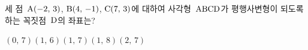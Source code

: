 세 점~$\mathrm{A}(-2,\,3)$, $\mathrm{B}(4,\,-1)$, $\mathrm{C}(7,\,3)$에 대하여 사각형~$\mathrm{ABCD}$가 평행사변형이 되도록 하는 꼭짓점~$\mathrm{D}$의 좌표는?
\begin{choices32}{$(0,\,7)$}{$(1,\,6)$}{$(1,\,7)$}{$(1,\,8)$}{$(2,\,7)$}\end{choices32}
